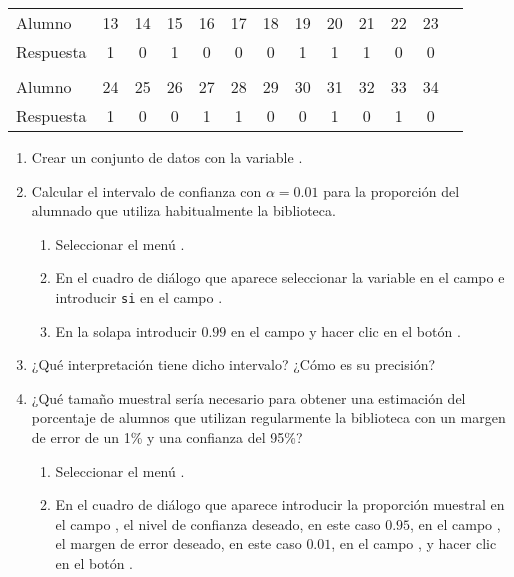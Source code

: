 \begin{enumerate}[leftmargin=*]
\begin{center}
\begin{tabular}{lcccccccccccc}
\hline
Alumno    & 13 & 14 & 15 & 16 & 17 & 18 & 19 & 20 & 21 & 22 & 23 \\
Respuesta & 1  & 0  & 1  & 0  & 0  & 0  & 1  & 1  & 1  & 0  & 0  \\
\hline\\
\hline
Alumno 	  & 24 & 25 & 26 & 27 & 28 & 29 & 30 & 31 & 32 & 33 & 34 \\
Respuesta & 1 & 0 & 0 & 1 & 1 & 0 & 0 & 1 & 0 & 1 & 0 \\
\hline
\end{tabular}
\end{center}

\begin{enumerate}
\item Crear un conjunto de datos con la variable .
\item Calcular el intervalo de confianza con $\alpha=0.01$ para la proporción del alumnado que utiliza habitualmente la biblioteca. 
\begin{indicacion}
\begin{enumerate}
\item Seleccionar el menú .
\item En el cuadro de diálogo que aparece seleccionar la variable  en el campo  e
introducir \texttt{si} en el campo .
\item En la solapa  introducir $0.99$ en el campo  y hacer clic en
el botón .
\end{enumerate}
\end{indicacion}

\item ¿Qué interpretación tiene dicho intervalo? ¿Cómo es su precisión?

\item ¿Qué tamaño muestral sería necesario para obtener una estimación del porcentaje de alumnos que utilizan regularmente la biblioteca 
con un margen de error de un 1\% y una confianza del 95\%? 
\begin{indicacion}
\begin{enumerate}
\item Seleccionar el menú .
\item En el cuadro de diálogo que aparece introducir la proporción muestral en el campo , el nivel de confianza
deseado, en este caso $0.95$, en el campo , el margen de error deseado, en este caso
$0.01$, en el campo , y hacer clic en el botón .
\end{enumerate}
\end{indicacion}
\end{enumerate}




\end{enumerate}
